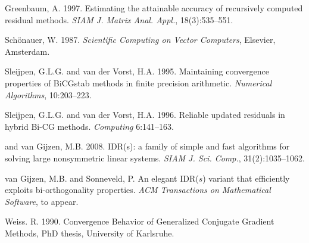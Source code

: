 \documentclass[prodmode,acmtoms]{acmsmall}
\begin{document}
\begin{thebibliography}{99}

{\sc Greenbaum, A.} 1997.
Estimating the attainable accuracy of recursively computed residual methods. 
{\em SIAM J. Matrix Anal. Appl.}, 18(3):535--551.

{\sc Sch\"onauer}, W. 1987.
{\em Scientific Computing on Vector Computers}, Elsevier, Amsterdam.

{\sc  Sleijpen, G.L.G.} and {\sc  van der Vorst, H.A.} 1995.
Maintaining convergence properties of BiCGstab methods in finite precision arithmetic.
{\em Numerical Algorithms}, 10:203--223.

{\sc Sleijpen, G.L.G. } and {\sc van der Vorst, H.A.} 1996.
Reliable updated residuals in hybrid Bi-CG methods. {\em Computing} 6:141--163.

and {\sc van Gijzen, M.B.} 2008.
IDR(s): a family of simple and fast algorithms for solving large nonsymmetric linear systems.
{\em SIAM J. Sci. Comp.}, 31(2):1035--1062.

{\sc van Gijzen, M.B.} and {\sc Sonneveld, P.} 
An elegant {IDR}($s$) variant that efficiently exploits bi-orthogonality properties.
{\em ACM Transactions on Mathematical Software}, to appear.

{\sc Weiss. R.} 1990. { Convergence Behavior of Generalized Conjugate 
Gradient Methods,} PhD thesis, University of Karlsruhe.

\end{thebibliography}
\end{document}
